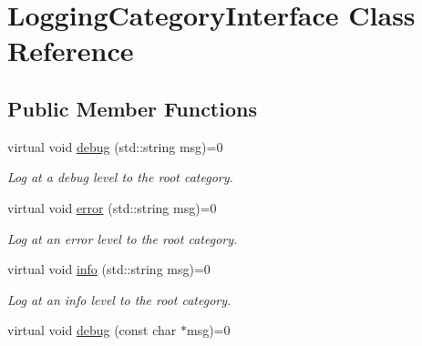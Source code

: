 \hypertarget{classLoggingCategoryInterface}{\section{Logging\-Category\-Interface Class Reference}
\label{classLoggingCategoryInterface}
}
\subsection*{Public Member Functions}
\begin{DoxyCompactItemize}
\item 
\hypertarget{classLoggingCategoryInterface_aca90c0a8380658a3918ee4c6eb60314b}{virtual void \hyperlink{classLoggingCategoryInterface_aca90c0a8380658a3918ee4c6eb60314b}{debug} (std\-::string msg)=0}\label{classLoggingCategoryInterface_aca90c0a8380658a3918ee4c6eb60314b}

\begin{DoxyCompactList}\small\item\em Log at a debug level to the root category. \end{DoxyCompactList}\item 
\hypertarget{classLoggingCategoryInterface_a377b5248cd5f1c67dc7f13250bf56d78}{virtual void \hyperlink{classLoggingCategoryInterface_a377b5248cd5f1c67dc7f13250bf56d78}{error} (std\-::string msg)=0}\label{classLoggingCategoryInterface_a377b5248cd5f1c67dc7f13250bf56d78}

\begin{DoxyCompactList}\small\item\em Log at an error level to the root category. \end{DoxyCompactList}\item 
\hypertarget{classLoggingCategoryInterface_a2a8bf026f9aeaea95f443744292e237b}{virtual void \hyperlink{classLoggingCategoryInterface_a2a8bf026f9aeaea95f443744292e237b}{info} (std\-::string msg)=0}\label{classLoggingCategoryInterface_a2a8bf026f9aeaea95f443744292e237b}

\begin{DoxyCompactList}\small\item\em Log at an info level to the root category. \end{DoxyCompactList}\item 
\hypertarget{classLoggingCategoryInterface_a6633ea62fbd9850de9f95c42bcb98209}{virtual void \hyperlink{classLoggingCategoryInterface_a6633ea62fbd9850de9f95c42bcb98209}{debug} (const char $\ast$msg)=0}\label{classLoggingCategoryInterface_a6633ea62fbd9850de9f95c42bcb98209}


\end{DoxyCompactItemize}
